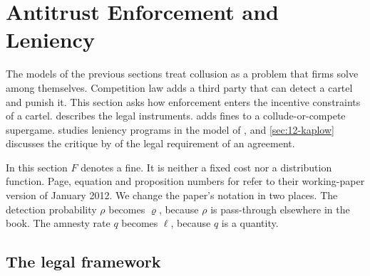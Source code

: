 \section{Antitrust Enforcement and Leniency}\label{sec:12-enforcement}

The models of the previous sections treat collusion as a problem that firms solve among themselves. Competition law
adds a third party that can detect a cartel and punish it. This section asks how enforcement enters the incentive
constraints of a cartel.  describes the legal instruments.  adds fines to a
collude-or-compete supergame.  studies leniency programs in the model of \citet{ChenRey2013},
and \cref{sec:12-kaplow} discusses the critique by \citet{Kaplow2013} of the legal requirement of an agreement.

In this section $F$ denotes a fine. It is neither a fixed cost nor a distribution function. Page, equation and
proposition numbers for \citet{ChenRey2013} refer to their working-paper version of January 2012. We change the
paper's notation in two places. The detection probability $\rho$ becomes $\varrho$, because $\rho$ is pass-through
elsewhere in the book. The amnesty rate $q$ becomes $\ell$, because $q$ is a quantity.

\subsection{The legal framework}\label{sec:12-legal}

